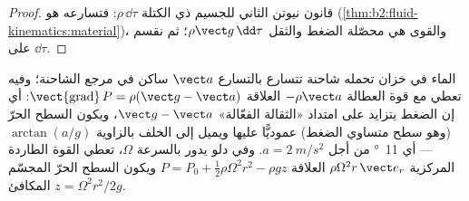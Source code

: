 \begin{proof}
قانون نيوتن الثاني للجسيم ذي الكتلة $\rho\,\dd\tau$: فتسارعه هو
 (\cref{thm:b2:fluid-kinematics:material})، والقوى هي
محصّلة الضغط والثقل $\rho\vect g\,\dd\tau$؛ ثم نقسم على $\dd\tau$.
\end{proof}

\begin{example}\label{ex:b2:euler-bernoulli:tank}
الماء في خزان تحمله شاحنة تتسارع بالتسارع $\vect a$ ساكن في
مرجع الشاحنة؛ وفيه تعطي  مع قوة العطالة $-\rho\vect a$
العلاقة $\operatorname{\vect{grad}}P = \rho(\vect g - \vect a)$: أي إن الضغط
يتزايد على امتداد «الثقالة الفعّالة» $\vect g - \vect a$، ويكون
السطح الحرّ (وهو سطح متساوي الضغط) عموديًّا عليها ويميل إلى
الخلف بالزاوية $\arctan(a/g)$ --- أي \qty{11}{\degree} من أجل $a = \qty{2}{m/s^2}$.
وفي دلو يدور بالسرعة $\Omega$، تعطي القوة الطاردة المركزية $\rho\Omega^2r\,\vect e_r$
العلاقة $P = P_0 + \tfrac12\rho\Omega^2r^2 - \rho gz$ ويكون السطح الحرّ
المجسّم المكافئ $z = \Omega^2r^2/2g$.
\end{example}

